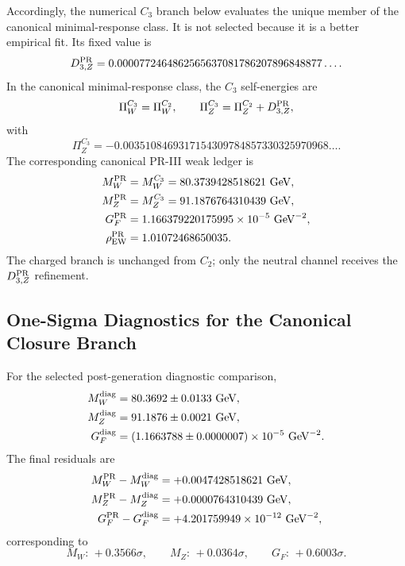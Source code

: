 \documentclass[11pt]{article}
\begin{document}
Accordingly, the numerical \(C_3\) branch below evaluates the unique member of
the canonical minimal-response class.  It is not selected because it is a
better empirical fit.
Its fixed value is
\begin{equation}
D_{3,Z}^{\rm PR}
=
0.0000772464862565637081786207896848877\ldots .
\label{eq:priii-ew-D3-neutral-numerical}
\end{equation}
In the canonical minimal-response class, the \(C_3\) self-energies are
\begin{equation}
\Pi_W^{C_3}
=
\Pi_W^{C_2},
\qquad
\Pi_Z^{C_3}
=
\Pi_Z^{C_2}+D_{3,Z}^{\rm PR},
\end{equation}
with
\begin{equation}
\Pi_Z^{C_3}
=
-0.0035108469317154309784857330325970968\ldots .
\end{equation}
The corresponding canonical PR-III weak ledger is
\begin{align}
M_W^{\rm PR}
&=
M_W^{C_3}
=
80.3739428518621\ {\rm GeV},
\\
M_Z^{\rm PR}
&=
M_Z^{C_3}
=
91.1876764310439\ {\rm GeV},
\\
G_F^{\rm PR}
&=
1.166379220175995\times10^{-5}\ {\rm GeV}^{-2},
\\
\rho_{\rm EW}^{\rm PR}
&=
1.01072468650035 .
\end{align}
The charged branch is unchanged from \(C_2\); only the neutral channel receives the \(D_{3,Z}^{\rm PR}\) refinement.

\subsection{One-Sigma Diagnostics for the Canonical Closure Branch}
\label{subsec:priii-ew-final-precision}

For the selected post-generation diagnostic comparison,
\begin{align}
M_W^{\rm diag}
&=
80.3692\pm0.0133\ {\rm GeV},
\\
M_Z^{\rm diag}
&=
91.1876\pm0.0021\ {\rm GeV},
\\
G_F^{\rm diag}
&=
\left(1.1663788\pm0.0000007\right)
\times10^{-5}\ {\rm GeV}^{-2}.
\end{align}
The final residuals are
\begin{align}
M_W^{\rm PR}-M_W^{\rm diag}
&=
+0.0047428518621\ {\rm GeV},
\\
M_Z^{\rm PR}-M_Z^{\rm diag}
&=
+0.0000764310439\ {\rm GeV},
\\
G_F^{\rm PR}-G_F^{\rm diag}
&=
+4.201759949\times10^{-12}\ {\rm GeV}^{-2},
\end{align}
corresponding to
\begin{equation}
\boxed{
M_W:\,+0.3566\sigma,
\qquad
M_Z:\,+0.0364\sigma,
\qquad
G_F:\,+0.6003\sigma .
}
\label{eq:priii-ew-final-sigma}
\end{equation}
\end{document}
